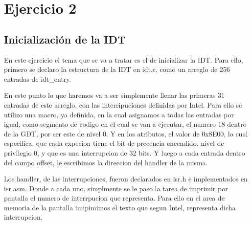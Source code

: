 \section{Ejercicio 2}
\subsection*{Inicialización de la IDT}
\par{En este ejercicio el tema que se va a tratar es el de inicializar la IDT. Para ello, primero se declaro la estructura de la IDT en idt.c, como un arreglo de 256 entradas de idt\_entry.}
\par{En este punto lo que haremos va a ser simplemente llenar las primeras 31 entradas de este arreglo, con las interripuciones definidas por Intel. Para ello se utilizo una macro, ya definida, en la cual asignamos a todas las entradas por igual, como segmento de codigo en el cual se van a ejecutar, el numero 18 dentro de la GDT, por ser este de nivel 0. Y en los atributos, el valor de 0x8E00, lo cual especifica, que cada expecion tiene el bit de precencia encendido, nivel de privilegio 0, y que es una interrupcion de 32 bits. Y luego a cada entrada dentro del campo offset, le escribimos la direccion del handler de la misma.}
\par{Los handler, de las interrupciones, fueron declarados en isr.h e implementados en isr.asm. Donde a cada uno, simplmente se le paso la tarea de imprimir por pantalla el numero de interrpucion que representa. Para ello en el area de memoria de la pantalla imipimimos el texto que segun Intel, representa dicha interrupcion.}